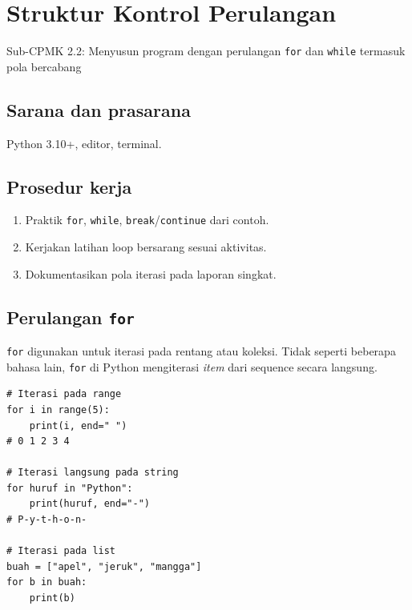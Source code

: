 ﻿\documentclass[../main.tex]{subfiles}
\begin{document}
\chapter{Struktur Kontrol Perulangan}

\begin{subcpmk}
  \item Sub-CPMK 2.2: Menyusun program dengan perulangan \texttt{for} dan \texttt{while} termasuk pola bercabang
\end{subcpmk}


\section{Sarana dan prasarana}

Python 3.10+, editor, terminal.

\section{Prosedur kerja}

\begin{enumerate}[leftmargin=*]
  \item Praktik \texttt{for}, \texttt{while}, \texttt{break}/\texttt{continue} dari contoh.
  \item Kerjakan latihan loop bersarang sesuai aktivitas.
  \item Dokumentasikan pola iterasi pada laporan singkat.
\end{enumerate}

\section{Perulangan \texttt{for}}

\texttt{for} digunakan untuk iterasi pada rentang atau koleksi. Tidak seperti beberapa bahasa lain, \texttt{for} di Python mengiterasi \textit{item} dari sequence secara langsung.

\begin{lstlisting}[caption=for dengan range dan iterasi langsung (Tutorial Python ss4.2)]
# Iterasi pada range
for i in range(5):
    print(i, end=" ")
# 0 1 2 3 4

# Iterasi langsung pada string
for huruf in "Python":
    print(huruf, end="-")
# P-y-t-h-o-n-

# Iterasi pada list
buah = ["apel", "jeruk", "mangga"]
for b in buah:
    print(b)
\end{lstlisting}
\end{document}
